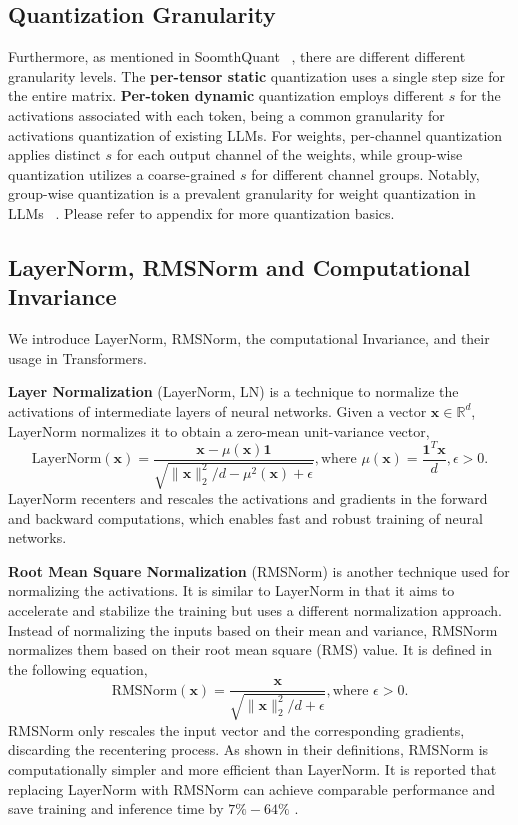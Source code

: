 \subsection{Quantization Granularity} 
\label{quant_granularity}
Furthermore, as mentioned in SoomthQuant ~\citep{xiao2022smoothquant}, there are different different granularity levels. The \textbf{per-tensor static} quantization uses a single step size for the entire matrix. \textbf{Per-token dynamic} quantization employs different $s$ for the activations associated with each token, being a common granularity for activations quantization of existing LLMs. For weights, per-channel quantization applies distinct $s$ for each output channel of the weights, while group-wise quantization utilizes a coarse-grained $s$ for different channel groups. Notably, group-wise quantization is a prevalent granularity for weight quantization in LLMs ~\citep{frantar2022gptq,yao2022zeroquant}. Please refer to appendix for more quantization basics.

\subsection{LayerNorm, RMSNorm and Computational Invariance}
\label{section:background-norm}
We introduce LayerNorm, RMSNorm, the computational Invariance, and their usage in Transformers.

\textbf{Layer Normalization} (LayerNorm, LN) \citep{layernorm} is a technique to normalize the activations of intermediate layers of neural networks.
Given a vector $\mathbf{x} \in \mathbb{R}^d$, LayerNorm normalizes it to obtain a zero-mean unit-variance vector,
\begin{equation}
    \text{LayerNorm}(\mathbf{x}) = \frac{\mathbf{x} - \mu(\mathbf{x})\mathbf{1}}{\sqrt{\lVert{\mathbf{x}}\lVert_2^2/ d - \mu^2(\mathbf{x}) + \epsilon}}, \text{where } \mu(\mathbf{x}) = \frac{\mathbf{1}^T \mathbf{x}}{d}, \epsilon > 0.
\end{equation}
LayerNorm recenters and rescales the activations and gradients in the forward and backward computations, which enables fast and robust training of neural networks.

\textbf{Root Mean Square Normalization} (RMSNorm) \citep{RMSNorm} is another technique used for normalizing the activations.
It is similar to LayerNorm in that it aims to accelerate and stabilize the training but uses a different normalization approach.
Instead of normalizing the inputs based on their mean and variance, RMSNorm normalizes them based on their root mean square (RMS) value.
It is defined in the following equation,
\begin{equation}
    \text{RMSNorm}(\mathbf{x}) = \frac{\mathbf{x}}{\sqrt{\lVert{\mathbf{x}}\lVert_2^2 / d + \epsilon}}, \text{where } \epsilon > 0.
\end{equation}
RMSNorm only rescales the input vector and the corresponding gradients, discarding the recentering process.
As shown in their definitions, RMSNorm is computationally simpler and more efficient than LayerNorm.
It is reported that replacing LayerNorm with RMSNorm can achieve comparable performance and save training and inference time by $7\%-64\%$ \citep{RMSNorm}.

